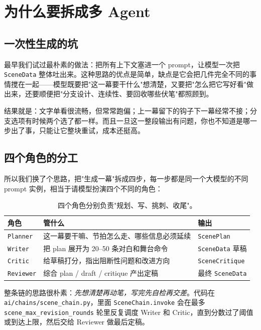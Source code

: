 \documentclass[12pt,a4paper]{article}
\begin{document}
\section{为什么要拆成多 Agent}
\label{sec:multiagent}

\subsection{一次性生成的坑}
最早我们试过最朴素的做法：把所有上下文塞进一个 prompt，让模型一次把 \texttt{SceneData} 整体吐出来。这种思路的优点是简单，缺点是它会把几件完全不同的事情搅在一起——模型既要把"这一幕要干什么"想清楚，又要把"怎么把它写好看"做出来，还要顺便把"分支设计、连续性、要回收哪些伏笔"都照顾到。

结果就是：文字单看很流畅，但常常跑偏；上一幕留下的钩子下一幕经常不接；分支选项有时候两个选了都一样。而且一旦这一整段输出有问题，你也不知道是哪一步出了事，只能让它整块重试，成本还挺高。

\subsection{四个角色的分工}
所以我们换了个思路，把"生成一幕"拆成四步，每一步都是同一个大模型的不同 prompt 实例，相当于请模型扮演四个不同的角色：

\begin{table}[H]
\centering
\renewcommand{\arraystretch}{1.25}
\begin{tabularx}{\textwidth}{l l X}
\toprule
\textbf{角色} & \textbf{管什么} & \textbf{输出}\\
\midrule
\texttt{Planner}   & 这一幕要干嘛、节拍怎么走、哪些信息必须延续 & \texttt{ScenePlan}\\
\texttt{Writer}    & 把 plan 展开为 20--50 条对白和舞台命令 & \texttt{SceneData} 草稿\\
\texttt{Critic}    & 给草稿打分，指出阻断性问题和改进方向  & \texttt{SceneCritique}\\
\texttt{Reviewer}  & 综合 plan / draft / critique 产出定稿 & 最终 \texttt{SceneData}\\
\bottomrule
\end{tabularx}
\caption{四个角色分别负责"规划、写、挑刺、收尾"。}
\end{table}

整条链的思路很朴素：\emph{先想清楚再动笔，写完先自检再交差}。代码在 \texttt{ai/chains/scene\_chain.py}，里面 \texttt{SceneChain.invoke} 会在最多 \texttt{scene\_max\_revision\_rounds} 轮里反复调度 Writer 和 Critic，直到分数过了阈值或到达上限，然后交给 Reviewer 做最后定稿。
\end{document}
